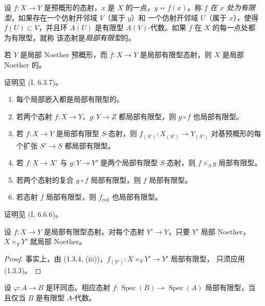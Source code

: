 \begin{definition}[1.3.2]
\label{IV.1.3.2-fr}
设 $f:X\to Y$ 是预概形的态射，$x$ 是 $X$ 的一点，$y=f(x)$。称 $f$
\emph{在 $x$ 处为有限型}，如果存在一个仿射开邻域 $V$（属于 $y$）和
一个仿射开邻域 $U$（属于 $x$），使得 $f(U)\subset V$，并且环
$A(U)$ 是有限型 $A(V)$-代数。如果 $f$ 在 $X$ 的每一点处都为有限型，就称
该态射是\emph{局部有限型}的。
\end{definition}


\begin{proposition}[1.3.3]
\label{IV.1.3.3-fr}
若 $Y$ 是局部 Noether 预概形，而 $f:X\to Y$ 是局部有限型态射，则
$X$ 是局部 Noether 的。
\end{proposition}

证明见 (I, 6.3.7)。

\begin{proposition}[1.3.4]
\label{IV.1.3.4-fr}
\begin{enumerate}
  \item[(i)] 每个局部嵌入都是局部有限型的。
  \item[(ii)] 若两个态射 $f:X\to Y$、$g:Y\to Z$ 都局部有限型，则
  $g\circ f$ 也局部有限型。
  \item[(iii)] 若 $f:X\to Y$ 是局部有限型 $S$-态射，则
  $f_{(S')}:X_{(S')}\to Y_{(S')}$ 对基预概形的每个扩张 $S'\to S$
  都局部有限型。
  \item[(iv)] 若 $f:X\to X'$ 与 $g:Y\to Y'$ 是两个局部有限型
  $S$-态射，则 $f\times_Sg$ 局部有限型。
  \item[(v)] 若两个态射的复合 $g\circ f$ 局部有限型，则 $f$ 局部有限型。
  \item[(vi)] 若态射 $f$ 局部有限型，则 $f_{\mathrm{red}}$ 也局部有限型。
\end{enumerate}
\end{proposition}

证明见 (I, 6.6.6)。

\begin{corollary}[1.3.5]
\label{IV.1.3.5-fr}
设 $f:X\to Y$ 是局部有限型态射。对每个态射 $Y'\to Y$，只要 $Y'$
局部 Noether，$X\times_YY'$ 就局部 Noether。
\end{corollary}

\begin{proof}
事实上，由 (1.3.4, (iii))，$f_{(Y')}:X\times_YY'\to Y'$ 局部有限型，
只须应用 (1.3.3)。
\end{proof}

\begin{proposition}[1.3.6]
\label{IV.1.3.6-fr}
设 $\varphi:A\to B$ 是环同态。相应态射
$f:\operatorname{Spec}(B)\to\operatorname{Spec}(A)$ 局部有限型，当且仅当
$B$ 是有限型 $A$-代数。
\end{proposition}

